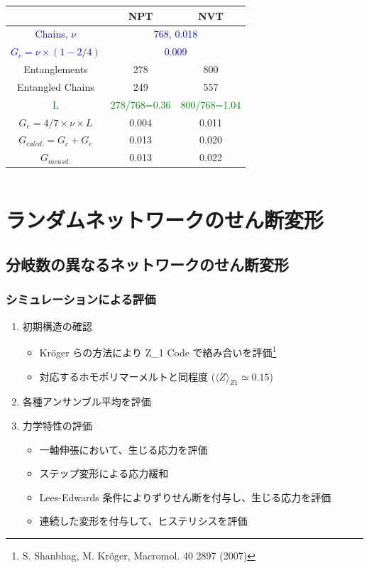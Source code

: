 \documentclass[12pt, dvipdfmx]{beamer}
\begin{document}
\begin{frame}
\begin{columns}[onlytextwidth]
		\scriptsize
			\centering
			\begin{tabular}{c|c|c} \hline
				&NPT & NVT \\ \hline \hline
				\textcolor{blue}{Chains, $\nu$} & \multicolumn{2}{|c}{\textcolor{blue}{768, 0.018}}\\ \hline
				\textcolor{blue}{$G_c = \nu \times (1-2/4)$}&\multicolumn{2}{|c}{\textcolor{blue}{0.009}} \\ \hline \hline
				Entanglements& 278& 800\\ \hline
				Entangled Chains&249&557 \\ \hline
				\textcolor{green}{L} & \textcolor{green}{278/768=0.36} & \textcolor{green}{800/768=1.04} \\ \hline
				$G_e=4/7 \times \nu \times L $ & 0.004 & 0.011 \\ \hline \hline
				\alert{$G_{calcd.}=G_c + G_e$} & \alert{0.013} & \alert{0.020} \\ \hline \hline
				$G_{measd.}$ & 0.013 & 0.022 \\ \hline
			\end{tabular}
	\end{columns}
\end{frame}




\section{ランダムネットワークのせん断変形}
\subsection{分岐数の異なるネットワークのせん断変形}
\begin{frame}
	\frametitle{シミュレーションによる評価}
	\begin{enumerate}
		\item 初期構造の確認
			\begin{itemize}
				\item Kr\"{o}ger らの方法により Z\_1 Code で絡み合いを評価\footnote[1]{
					S. Shanbhag, M. Kr\"{o}ger, Macromol. 40 2897 (2007)
				}
				\item 対応するホモポリマーメルトと同程度 ($\langle Z \rangle_{Z1} \simeq 0.15$)
			\end{itemize}
		\item 各種アンサンブル平均を評価
		\item 力学特性の評価
			\begin{itemize}
				\item 一軸伸張において、生じる応力を評価
				\item ステップ変形による応力緩和
				\item \alert{Lees-Edwards 条件によりずりせん断}を付与し、生じる応力を評価
				\item 連続した変形を付与して、ヒステリシスを評価
			\end{itemize}	
	\end{enumerate}
\end{frame}
\end{document}
